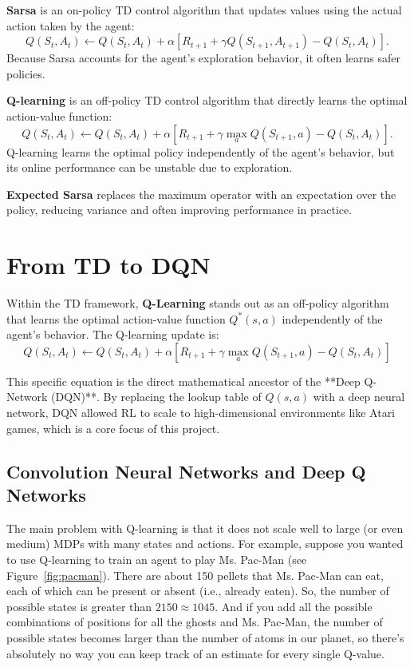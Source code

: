\textbf{Sarsa} is an on-policy TD control algorithm that updates values using the actual action taken by the agent:
\[
Q(S_t, A_t) \leftarrow Q(S_t, A_t) + \alpha \left[ R_{t+1} + \gamma Q(S_{t+1}, A_{t+1}) - Q(S_t, A_t) \right].
\]
Because Sarsa accounts for the agent’s exploration behavior, it often learns safer policies.




\textbf{Q-learning} is an off-policy TD control algorithm that directly learns the optimal action-value function:
\[
Q(S_t, A_t) \leftarrow Q(S_t, A_t) + \alpha \left[ R_{t+1} + \gamma \max_a Q(S_{t+1}, a) - Q(S_t, A_t) \right].
\]
Q-learning learns the optimal policy independently of the agent’s behavior, but its online performance can be unstable due to exploration.




\textbf{Expected Sarsa} replaces the maximum operator with an expectation over the policy, reducing variance and often improving performance in practice.





\section{From TD to DQN}
Within the TD framework, \textbf{Q-Learning} stands out as an off-policy algorithm that learns the optimal action-value function $Q^*(s, a)$ independently of the agent's behavior. The Q-learning update is:
$$Q(S_t, A_t) \leftarrow Q(S_t, A_t) + \alpha [R_{t+1} + \gamma \max_a Q(S_{t+1}, a) - Q(S_t, A_t)]$$

This specific equation is the direct mathematical ancestor of the **Deep Q-Network (DQN)**. By replacing the lookup table of $Q(s, a)$ with a deep neural network, DQN allowed RL to scale to high-dimensional environments like Atari games, which is a core focus of this project.


\subsection{Convolution Neural Networks and Deep Q Networks}

The main problem with Q-learning is that it does not scale well to large (or even medium) MDPs with many states and actions. For example, suppose you wanted to use Q-learning to train an agent to play Ms. Pac-Man (see Figure~\ref{fig:pacman}). There are about 150 pellets that Ms. Pac-Man can eat, each of which can be present or absent (i.e., already eaten). So, the number of possible states is greater than $2150 \approx 1045$. And if you add all the possible combinations of positions for all the ghosts and Ms. Pac-Man, the number of possible states becomes larger than the number of atoms in our planet, so there’s absolutely no way you can keep track of an estimate for every single Q-value. \cite{geron}


